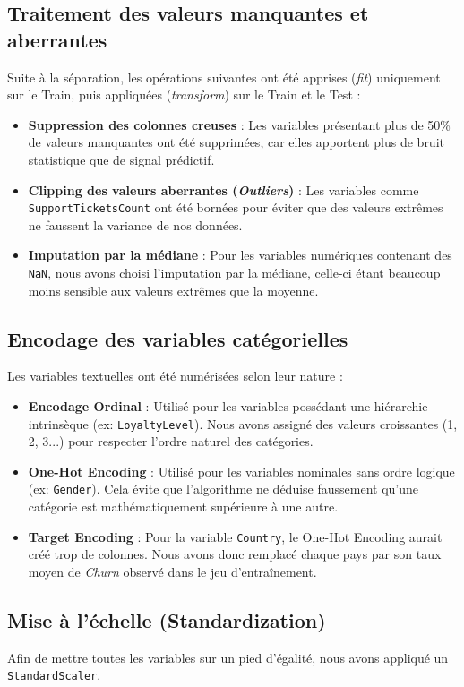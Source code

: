 \subsection{Traitement des valeurs manquantes et aberrantes}
Suite à la séparation, les opérations suivantes ont été apprises (\textit{fit}) uniquement sur le Train, puis appliquées (\textit{transform}) sur le Train et le Test :
\begin{itemize}
	\item \textbf{Suppression des colonnes creuses} : Les variables présentant plus de 50\% de valeurs manquantes ont été supprimées, car elles apportent plus de bruit statistique que de signal prédictif.
	\item \textbf{Clipping des valeurs aberrantes (\textit{Outliers})} : Les variables comme \texttt{SupportTicketsCount} ont été bornées pour éviter que des valeurs extrêmes ne faussent la variance de nos données.
	\item \textbf{Imputation par la médiane} : Pour les variables numériques contenant des \texttt{NaN}, nous avons choisi l'imputation par la médiane, celle-ci étant beaucoup moins sensible aux valeurs extrêmes que la moyenne.
\end{itemize}

\subsection{Encodage des variables catégorielles}
Les variables textuelles ont été numérisées selon leur nature :
\begin{itemize}
	\item \textbf{Encodage Ordinal} : Utilisé pour les variables possédant une hiérarchie intrinsèque (ex: \texttt{LoyaltyLevel}). Nous avons assigné des valeurs croissantes (1, 2, 3...) pour respecter l'ordre naturel des catégories.
	\item \textbf{One-Hot Encoding} : Utilisé pour les variables nominales sans ordre logique (ex: \texttt{Gender}). Cela évite que l'algorithme ne déduise faussement qu'une catégorie est mathématiquement supérieure à une autre.
	\item \textbf{Target Encoding} : Pour la variable \texttt{Country}, le One-Hot Encoding aurait créé trop de colonnes. Nous avons donc remplacé chaque pays par son taux moyen de \textit{Churn} observé dans le jeu d'entraînement.
\end{itemize}

\subsection{Mise à l'échelle (Standardization)}
Afin de mettre toutes les variables sur un pied d'égalité, nous avons appliqué un \texttt{StandardScaler}.

